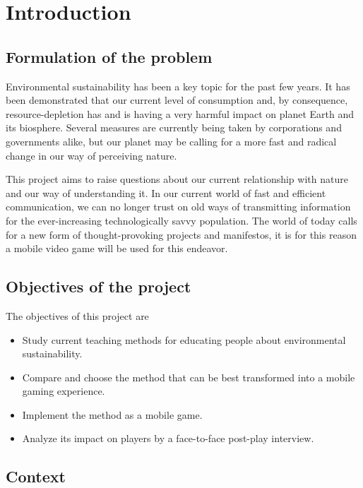 \chapter{Introduction}
\section{Formulation of the problem}

Environmental sustainability has been a key topic for the past few years. It has been demonstrated
\cite{stateofglobalair}
that our current level of consumption and, by consequence, resource-depletion has and is having a very harmful impact on planet Earth and its biosphere. Several measures are currently being taken
\cite{climatechangepolicies}
by corporations and governments alike, but our planet may be calling for a more fast and radical change in our way of perceiving nature.

This project aims to raise questions about our current relationship with nature and our way of understanding it. In our current world of fast and efficient communication, we can no longer trust on old ways of transmitting information
\cite{teensdontread}
for the ever-increasing technologically savvy population. The world of today calls for a new form of thought-provoking projects and manifestos, it is for this reason a mobile video game will be used for this endeavor.

\section{Objectives of the project}

The objectives of this project are

\begin{itemize}
	\item Study current teaching methods for educating people about environmental sustainability.
    \item Compare and choose the method that can be best transformed into a mobile gaming experience.
    \item Implement the method as a mobile game.
    \item Analyze its impact on players by a face-to-face post-play interview.
\end{itemize}

\section{Context}

